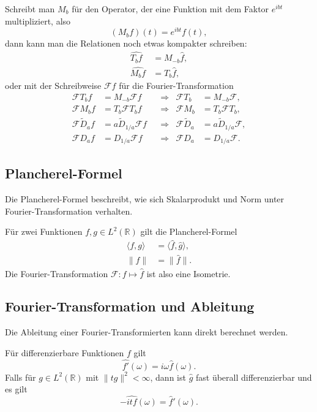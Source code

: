 Schreibt man $M_b$ für den Operator, der eine Funktion mit dem
Faktor $e^{ibt}$ multipliziert, also
\[
(M_bf)(t) = e^{ibt}f(t),
\]
dann kann man die Relationen noch etwas kompakter schreiben:
\begin{align*}
\widehat{T_bf}
&=
M_{-b}\hat{f},
\\
\widehat{M_bf}
&=
T_b\hat{f},
\end{align*}
oder mit der Schreibweise $\mathcal{F}f$ für die Fourier-Transformation
\[
\begin{aligned}
\mathcal{F}T_b f &= M_{-b}\mathcal F f
&&\Rightarrow &
\mathcal{F}T_b &= M_{-b}\mathcal{F},
\\
\mathcal{F}M_b f&=T_b\mathcal{F}T_bf
&&\Rightarrow &
\mathcal{F}M_b&=T_b\mathcal{F}T_b,
\\
\mathcal{F}\tilde{D}_af&=a \tilde{D}_{1/a} \mathcal F f
&&\Rightarrow &
\mathcal{F}\tilde{D}_a&=a \tilde{D}_{1/a} \mathcal F,
\\
\mathcal{F}D_af&=D_{1/a} \mathcal F f
&&\Rightarrow &
\mathcal{F}D_a&= D_{1/a} \mathcal F.
\end{aligned}
\]

\subsection{Plancherel-Formel}
%
Die Plancherel-Formel beschreibt, wie sich Skalarprodukt und Norm
unter Fourier-Transformation verhalten.

\begin{satz}
Für zwei Funktionen $f,g\in L^2(\mathbb R)$ gilt die Plancherel-Formel
\begin{align*}
\langle f,g\rangle
&=
\langle \hat{f},\hat{g}\rangle,
\\
\|f\|&=\|\hat{f}\|.
\end{align*}
Die Fourier-Transformation $\mathcal{F}\colon f\mapsto \hat{f}$ ist
also eine Isometrie.
\end{satz}

\subsection{Fourier-Transformation und Ableitung
\label{subsection:ft-ableitung}}
Die Ableitung einer Fourier-Transformierten kann direkt berechnet werden.

\begin{satz}
\label{fourier:satz:ableitung}
Für differenzierbare Funktionen $f$ gilt
\[
\widehat{f'}(\omega) = i\omega \hat{f}(\omega).
\]
Falls für $g\in L^2(\mathbb R)$ mit $\|tg\|^2<\infty$, dann ist $\hat{g}$
fast überall differenzierbar und es gilt
\[
-\widehat{i t f}(\omega) = \hat{f}'(\omega).
\]
\end{satz}

